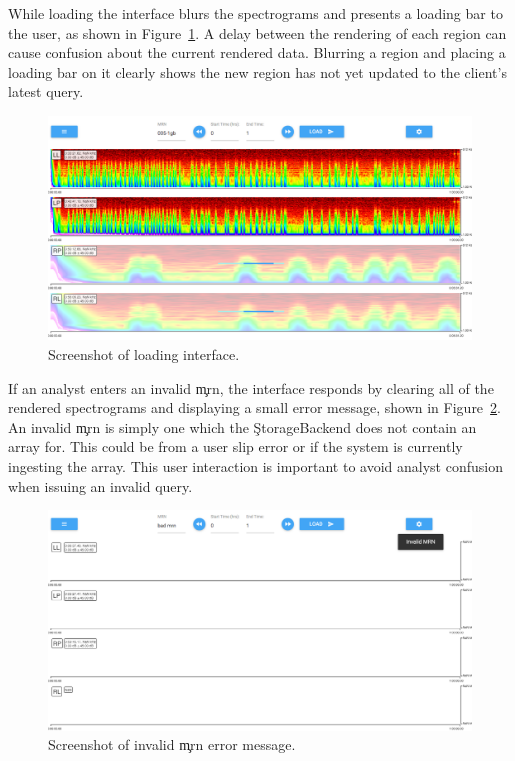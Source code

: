 While loading the interface blurs the spectrograms and presents a loading bar
to the user, as shown in Figure~\ref{fig:loading}. A delay between the
rendering of each region can cause confusion about the current rendered data.
Blurring a region and placing a loading bar on it clearly shows the new region
has not yet updated to the client's latest query. \\

\begin{figure}[h]
\begin{center}
\includegraphics[scale=0.35]{./img/loading.png}
\caption{Screenshot of loading interface.}
\label{fig:loading}
\end{center}
\end{figure}

If an analyst enters an invalid \c{mrn}, the interface responds by clearing all
of the rendered spectrograms and displaying a small error message, shown in
Figure~\ref{fig:error}. An invalid \c{mrn} is simply one which the
\c{StorageBackend} does not contain an array for. This could be from a user slip
error or if the system is currently ingesting the array. This user interaction
is important to avoid analyst confusion when issuing an invalid query. \\

\begin{figure}[h]
\begin{center}
\includegraphics[scale=0.35]{./img/error.png}
\caption{Screenshot of invalid \c{mrn} error message.}
\label{fig:error}
\end{center}
\end{figure}

